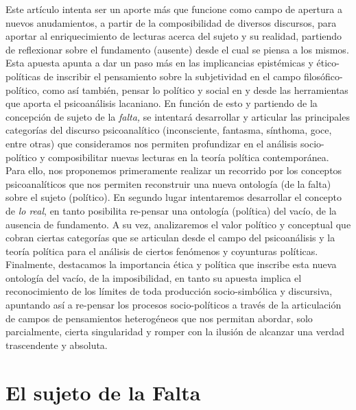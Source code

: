 \documentclass{book}
\begin{document}
Este artículo intenta ser un aporte más que funcione como campo de
apertura a nuevos anudamientos, a partir de la composibilidad de
diversos discursos, para aportar al enriquecimiento de lecturas acerca
del sujeto y su realidad, partiendo de reflexionar sobre el fundamento
(ausente) desde el cual se piensa a los mismos. Esta apuesta apunta a
dar un paso más en las implicancias epistémicas y ético-políticas de
inscribir el pensamiento sobre la subjetividad en el campo
filosófico-político, como así también, pensar lo político y social en y
desde las herramientas que aporta el psicoanálisis lacaniano. En función
de esto y partiendo de la concepción de sujeto de la \emph{falta,} se
intentará desarrollar y articular las principales categorías del
discurso psicoanalítico (inconsciente, fantasma, sínthoma, goce, entre
otras) que consideramos nos permiten profundizar en el análisis
socio-político y composibilitar nuevas lecturas en la teoría política
contemporánea. Para ello, nos proponemos primeramente realizar un
recorrido por los conceptos psicoanalíticos que nos permiten reconstruir
una nueva ontología (de la falta) sobre el sujeto (político). En segundo
lugar intentaremos desarrollar el concepto de \emph{lo real}, en tanto
posibilita re-pensar una ontología (política) del vacío, de la ausencia
de fundamento. A su vez, analizaremos el valor político y conceptual que
cobran ciertas categorías que se articulan desde el campo del
psicoanálisis y la teoría política para el análisis de ciertos fenómenos
y coyunturas políticas. Finalmente, destacamos la importancia ética y
política que inscribe esta nueva ontología del vacío, de la
imposibilidad, en tanto su apuesta implica el reconocimiento de los
límites de toda producción socio-simbólica y discursiva, apuntando así a
re-pensar los procesos socio-políticos a través de la articulación de
campos de pensamientos heterogéneos que nos permitan abordar, solo
parcialmente, cierta singularidad y romper con la ilusión de alcanzar
una verdad trascendente y absoluta.

\section{El sujeto de la Falta}
\end{document}
